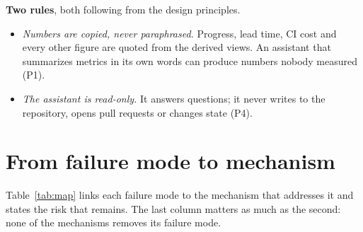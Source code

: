 \documentclass[11pt,a4paper]{article}
\begin{document}
\textbf{Two rules}, both following from the design principles.
\begin{itemize}
  \item \emph{Numbers are copied, never paraphrased.} Progress, lead time, CI cost and every other figure are quoted from the derived views. An assistant that summarizes metrics in its own words can produce numbers nobody measured (P1).
  \item \emph{The assistant is read-only.} It answers questions; it never writes to the repository, opens pull requests or changes state (P4).
\end{itemize}

\section{From failure mode to mechanism}
\label{sec:map}

Table~\ref{tab:map} links each failure mode to the mechanism that addresses it and states the risk that remains. The last column matters as much as the second: none of the mechanisms removes its failure mode.
\end{document}
